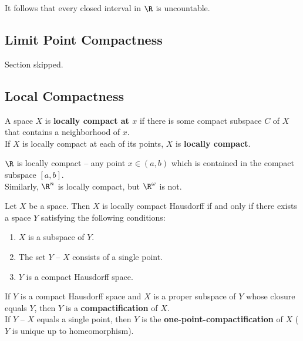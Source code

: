 \begin{remark}
It follows that every closed interval in $\R$ is uncountable.
\end{remark}

\subsection{Limit Point Compactness}

Section skipped.

\subsection{Local Compactness}

\begin{definition}
A space $X$ is \textbf{locally compact at $x$} if there is some compact subspace $C$ of $X$ that contains a neighborhood of $x$. \\

If $X$ is locally compact at each of its points, $X$ is \textbf{locally compact}.
\end{definition}

\begin{eg}
$\R$ is locally compact -- any point $x \in (a, b)$ which is contained in the compact subspace $[a, b]$. \\

Similarly, $\R^n$ is locally compact, but $\R^\omega$ is not.
\end{eg}

\begin{theorem}
Let $X$ be a space. Then $X$ is locally compact Hausdorff if and only if there exists a space $Y$ satisfying the following conditions:
\begin{enumerate}
    \item $X$ is a subspace of $Y$.
    \item The set $Y \text{ -- } X$ consists of a single point.
    \item $Y$ is a compact Hausdorff space.
\end{enumerate}
\end{theorem}

\begin{definition}
If $Y$ is a compact Hausdorff space and $X$ is a proper subspace of $Y$ whose closure equals $Y$, then $Y$ is a \textbf{compactification} of $X$. \\

If $Y \text{ -- } X$ equals a single point, then $Y$ is the \textbf{one-point-compactification} of $X$ ($Y$ is unique up to homeomorphism).
\end{definition}


